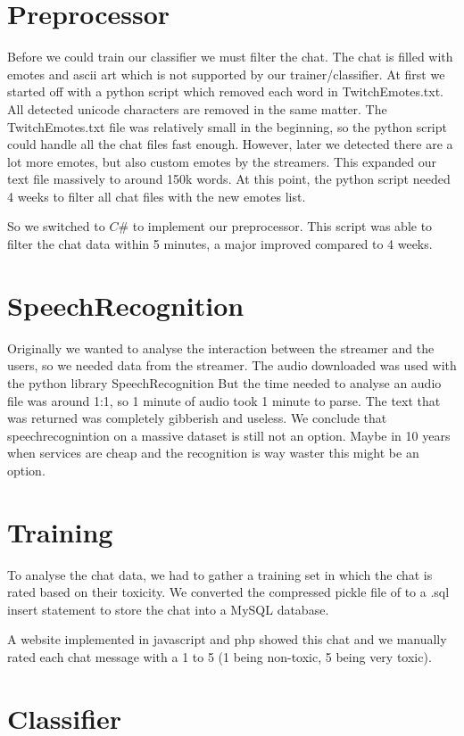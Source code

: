 \documentclass[final]{report}
\begin{document}
\section{Preprocessor}
Before we could train our classifier we must filter the chat. The chat is filled with emotes and ascii art which is not supported by our trainer/classifier.
At first we started off with a python script which removed each word in TwitchEmotes.txt. All detected unicode characters are removed in the same matter.
The TwitchEmotes.txt file was relatively small in the beginning, so the python script could handle all the chat files fast enough. However, later we detected there are a lot more emotes, but also custom emotes by the streamers.
This expanded our text file massively to around 150k words. At this point, the python script needed 4 weeks to filter all chat files with the new emotes list.

So we switched to $C\#$ to implement our preprocessor.
This script was able to filter the chat data within 5 minutes, a major improved compared to 4 weeks.

\section{SpeechRecognition}
Originally we wanted to analyse the interaction between the streamer and the users, so we needed data from the streamer.
The audio downloaded was used with the python library SpeechRecognition %
But the time needed to analyse an audio file was around 1:1, so 1 minute of audio took 1 minute to parse. The text that was returned was completely gibberish and useless.
We conclude that speechrecognintion on a massive dataset is still not an option. Maybe in 10 years when services are cheap and the recognition is way waster this might be an option.

\section{Training}
To analyse the chat data, we had to gather a training set in which the chat is rated based on their toxicity.
We converted the compressed pickle file of %
to a .sql insert statement to store the chat into a MySQL database.

A website implemented in javascript and php showed this chat and we manually rated each chat message with a 1 to 5 (1 being non-toxic, 5 being very toxic).

\section{Classifier}
\end{document}
